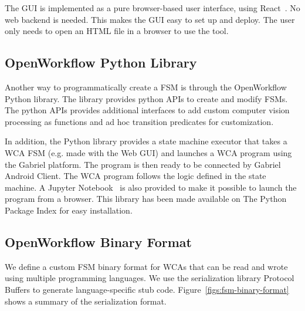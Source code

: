The GUI is implemented as a pure browser-based user interface, using
React~\cite{staff2016react}. No web backend is needed. This makes the GUI easy
to set up and deploy. The user only needs to open an HTML file in a browser to 
use the tool.

\subsection{OpenWorkflow Python Library}

Another way to programmatically create a FSM is through the OpenWorkflow Python
library. The library provides python APIs to create and modify FSMs. The python
APIs provides additional interfaces to add custom computer vision processing as
functions and ad hoc transition predicates for customization. 

In addition, the Python library provides a state machine executor that takes a
WCA FSM (e.g. made with the Web GUI) and launches a WCA program using the
Gabriel platform. The program is then ready to be connected by Gabriel Android
Client. The WCA program follows the logic defined in the state machine. A
Jupyter Notebook~\cite{kluyver2016jupyter} is also provided to make it possible to launch the program from
a browser. This library has been made available on The Python Package Index for
easy installation.

\subsection{OpenWorkflow Binary Format}

We define a custom FSM binary format for WCAs that can be read and wrote using
multiple programming languages. We use the serialization library Protocol
Buffers to generate language-specific stub code.
Figure~\ref{figs:fsm-binary-format} shows a summary of the serialization format.


